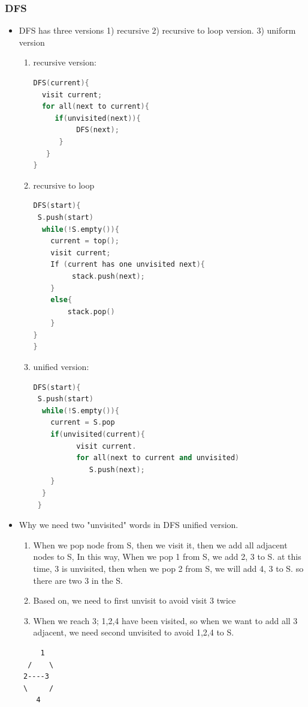 \documentclass[a4paper,11pt,twoside]{book}
\begin{document}
\subsubsection{DFS}
\begin{itemize}
\item DFS has three versions 1) recursive 2) recursive to loop version. 3) uniform version
\begin{enumerate}
\item recursive version:
\begin{lstlisting}[frame=single, language=c++]
DFS(current){
  visit current;
  for all(next to current){
     if(unvisited(next)){
          DFS(next);
      }
   }
}
\end{lstlisting} 
\item recursive to loop
\begin{lstlisting}[frame=single, language=c++]
DFS(start){
 S.push(start)  
  while(!S.empty()){
    current = top();
    visit current;
    If (current has one unvisited next){ 
         stack.push(next);
    }   
    else{
        stack.pop()
    }
}
}
\end{lstlisting} 
\item unified version:
\begin{lstlisting}[frame=single, language=c++]
DFS(start){
 S.push(start)  
  while(!S.empty()){
    current = S.pop
    if(unvisited(current){
          visit current.
          for all(next to current and unvisited)
             S.push(next);
    }
  }
 }
\end{lstlisting} 
\end{enumerate}

\item  Why we need two "unvisited" words in DFS unified version.  
\begin{enumerate}
\item When we pop node from S, then we visit it, then we add all adjacent nodes to S, In this way, When we pop 1 from S, we add 2, 3 to S. at this time, 3 is unvisited, then when we pop 2 from S, we will add 4, 3 to S. so there are two 3 in the S. 
\item Based on, we need to first unvisit to avoid visit 3 twice

\item When we reach 3; 1,2,4 have been visited, so when we want to add all 3 adjacent, we need second unvisited to avoid 1,2,4 to S.  
\end{enumerate}
\begin{verbatim}
     1
  /    \
 2----3
 \     /
    4      
\end{verbatim}


\end{itemize}
\end{document}

